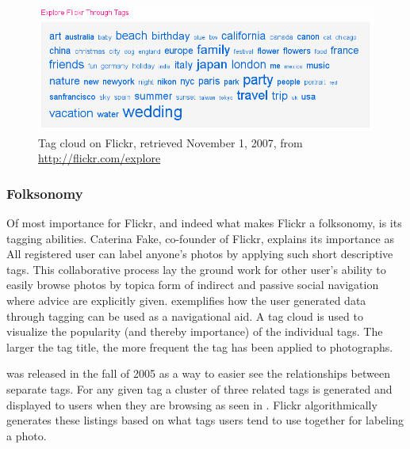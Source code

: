 \begin{figure}
  \begin{whole}
    \includegraphics[width=\wholewidth]{scrsh_flickr_tagcloud}
    \caption[Flickr Tag Cloud]{%
       Tag cloud on Flickr,
       retrieved November 1, 2007, from \url{http://flickr.com/explore}}
    \label{figure:scrsh.flickr.tagcloud}
  \end{whole}
\end{figure}

\subsubsection{Folksonomy}

\removeline

Of most importance
for Flickr, and indeed what makes Flickr a folksonomy, is its tagging
abilities. Caterina Fake, co-founder of Flickr, explains its importance as
All registered user can label anyone's photos by applying such short
descriptive tags. This collaborative process lay the ground work for other
user's ability to easily browse photos by topic\dash{}a form of indirect and
passive social navigation where advice are explicitly given.
exemplifies how the user generated data through tagging 
can be used as a navigational aid. A tag cloud is used to visualize the
popularity (and thereby importance) of the individual tags. The larger the
tag title, the more frequent the tag has been applied to photographs.

 was released in the fall of 2005 \citep{butterfield05}
as a way to easier see the relationships between separate tags. For any given
tag a cluster of three related tags is generated and displayed
 to users when
they are browsing as seen in .
Flickr algorithmically generates these listings based on what tags users tend
to use together for labeling a photo.

